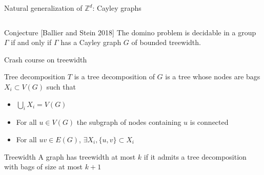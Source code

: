 \documentclass[11pt,dvipsnames,presentation,aspectratio=169]{beamer}
\begin{document}
\begin{frame}{Natural generalization of $\mathbb{Z}^d$: Cayley graphs}
\begin{columns}
\begin{column}{.35\textwidth}
\begin{center}
      \end{center}
    \end{column}
  \end{columns}

  \begin{alertblock}{Conjecture [Ballier and Stein 2018]}
    The domino problem is decidable in a group $\Gamma$ if and only if $\Gamma$
    has a Cayley graph $G$ of bounded treewidth.
  \end{alertblock}

\end{frame}

\begin{frame}{Crash course on treewidth}
  \begin{exampleblock}{Tree decomposition}
    $T$ is a tree decomposition of $G$ is a tree whose nodes are bags $X_i
    \subset V(G)$ such that
    \begin{itemize}
    \item $\bigcup_{i} X_i = V(G)$
    \item For all $u \in V(G)$ the subgraph of nodes containing $u$ is connected
    \item For all $uv \in E(G)$, $\exists X_i, \{u,v\} \subset X_i$
    \end{itemize}
  \end{exampleblock}

  \begin{exampleblock}{Treewidth}
    A graph has treewidth at most $k$ if it admits a tree decomposition with
    bags of size at most $k+1$
  \end{exampleblock}

\end{frame}
\end{document}
